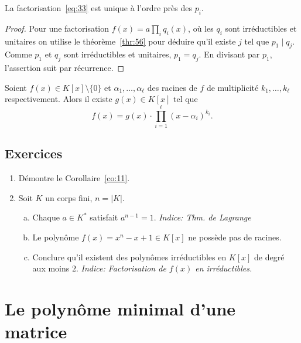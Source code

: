 \begin{theorem}
  \label{thr:57}
  La factorisation~\eqref{eq:33} est unique à l'ordre près des $p_i$. 
\end{theorem}

\begin{proof}
  Pour une  factorisation $f(x) = a ∏_i q_i(x)$, où les $q_i$ sont irréductibles et unitaires on utilise le théorème~\ref{thr:56} pour déduire qu'il  existe $j$ tel que  $p_1 \mid q_j$. Comme $p_1$ et $q_j$ sont  irréductibles et unitaires, $p_1 = q_j$. En divisant par $p_1$, l'assertion suit par récurrence. 
\end{proof}


\begin{corollary}
  \label{co:11}
  Soient $f(x) ∈ K[x] \setminus \{0\}$ et $α_1,\dots, α_ℓ$ des racines de $f$ de multiplicité $k_1,\dots,k_ℓ$ respectivement. Alors il existe $g(x)∈ K[x]$ tel que  
  \begin{displaymath}
    f(x) = g(x) ⋅ ∏_{i=1}^ℓ (x - α_i)^{k_i} .
  \end{displaymath}
\end{corollary}


\subsection*{Exercices}
\begin{enumerate}
\item    Démontre le Corollaire~\ref{co:11}.
\item Soit $K$ un corps fini, $ n=|K|$. \label{item:34} 
  \begin{enumerate}[a)] 
  \item Chaque $a ∈ K^*$ satisfait $a^{n-1} = 1$. \emph{Indice: Thm. de Lagrange}
  \item Le polynôme  $f(x) = x^n - x +1 ∈ K[x]$ ne possède pas de racines. 
  \item Conclure qu'il existent des polynômes irréductibles en $K[x]$ de degré aux moins $2$.  \emph{Indice: Factorisation de $f(x)$ en irréductibles. }
  \end{enumerate}
\end{enumerate}








\section{Le polynôme minimal d'une matrice}
\label{sec:le-polynome-minimal-1}


